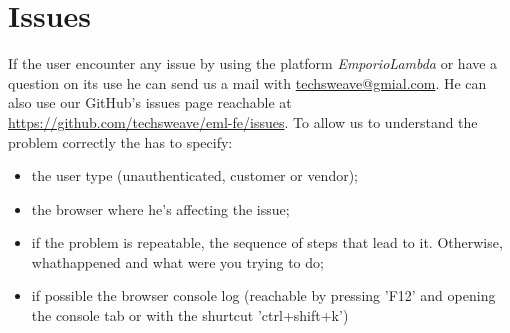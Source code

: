 \section{Issues}
If the user encounter any issue by using the platform \textit{EmporioLambda} or have a question on its use he can send us a mail with \href{mailto:techsweave@gmial.com}{techsweave@gmial.com}. He can also use our GitHub's issues page reachable at \href{https://github.com/techsweave/eml-fe/issues}{https://github.com/techsweave/eml-fe/issues}.
To allow us to understand the problem correctly the has to specify:
\begin{itemize}
    \item the user type (unauthenticated, customer or vendor);
    \item the browser where he's affecting the issue;
    \item if the problem is repeatable, the sequence of steps that lead to it. Otherwise, whathappened and what were you trying to do;
    \item if possible the browser console log (reachable by pressing {\selectfont 'F12'} and opening the console tab or with the shurtcut {\selectfont 'ctrl+shift+k'})

\end{itemize}